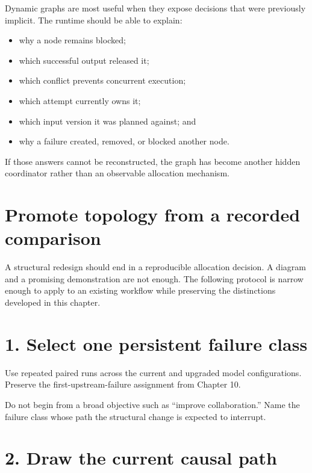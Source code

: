 Dynamic graphs are most useful when they expose decisions that were previously implicit. The runtime should be able to explain:

\begin{itemize}
\tightlist
\item
  why a node remains blocked;
\item
  which successful output released it;
\item
  which conflict prevents concurrent execution;
\item
  which attempt currently owns it;
\item
  which input version it was planned against; and
\item
  why a failure created, removed, or blocked another node.
\end{itemize}

If those answers cannot be reconstructed, the graph has become another hidden coordinator rather than an observable allocation mechanism.

\section{Promote topology from a recorded comparison}\label{promote-topology-from-a-recorded-comparison}

A structural redesign should end in a reproducible allocation decision. A diagram and a promising demonstration are not enough. The following protocol is narrow enough to apply to an existing workflow while preserving the distinctions developed in this chapter.

\section{1. Select one persistent failure class}\label{select-one-persistent-failure-class}

Use repeated paired runs across the current and upgraded model configurations. Preserve the first-upstream-failure assignment from Chapter 10.

Do not begin from a broad objective such as ``improve collaboration.'' Name the failure class whose path the structural change is expected to interrupt.

\section{2. Draw the current causal path}\label{draw-the-current-causal-path}

